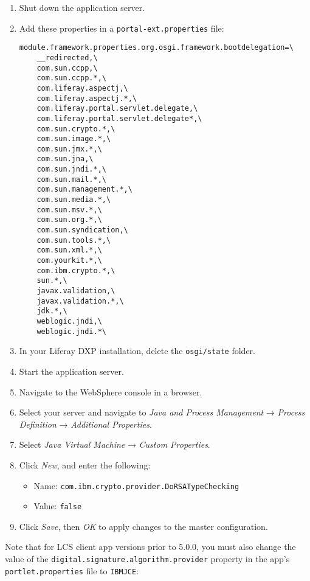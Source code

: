 \begin{enumerate}
\def\labelenumi{\arabic{enumi}.}
\item
  Shut down the application server.
\item
  Add these properties in a \texttt{portal-ext.properties} file:

\begin{verbatim}
module.framework.properties.org.osgi.framework.bootdelegation=\
    __redirected,\
    com.sun.ccpp,\
    com.sun.ccpp.*,\
    com.liferay.aspectj,\
    com.liferay.aspectj.*,\
    com.liferay.portal.servlet.delegate,\
    com.liferay.portal.servlet.delegate*,\
    com.sun.crypto.*,\
    com.sun.image.*,\
    com.sun.jmx.*,\
    com.sun.jna,\
    com.sun.jndi.*,\
    com.sun.mail.*,\
    com.sun.management.*,\
    com.sun.media.*,\
    com.sun.msv.*,\
    com.sun.org.*,\
    com.sun.syndication,\
    com.sun.tools.*,\
    com.sun.xml.*,\
    com.yourkit.*,\
    com.ibm.crypto.*,\
    sun.*,\
    javax.validation,\
    javax.validation.*,\
    jdk.*,\
    weblogic.jndi,\
    weblogic.jndi.*\
\end{verbatim}
\item
  In your Liferay DXP installation, delete the \texttt{osgi/state}
  folder.
\item
  Start the application server.
\item
  Navigate to the WebSphere console in a browser.
\item
  Select your server and navigate to \emph{Java and Process Management}
  → \emph{Process Definition} → \emph{Additional Properties}.
\item
  Select \emph{Java Virtual Machine} → \emph{Custom Properties}.
\item
  Click \emph{New}, and enter the following:

  \begin{itemize}
  \tightlist
  \item
    Name: \texttt{com.ibm.crypto.provider.DoRSATypeChecking}
  \item
    Value: \texttt{false}
  \end{itemize}
\item
  Click \emph{Save}, then \emph{OK} to apply changes to the master
  configuration.
\end{enumerate}

Note that for LCS client app versions prior to 5.0.0, you must also
change the value of the \texttt{digital.signature.algorithm.provider}
property in the app's \texttt{portlet.properties} file to
\texttt{IBMJCE}:


